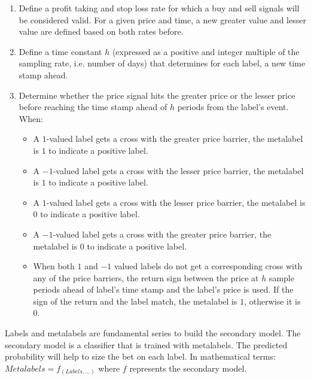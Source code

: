 \begin{enumerate}
  \item Define a profit taking and stop loss rate for which a buy and sell
        signals will be considered valid. For a given price and time, a new
        greater value and lesser value are defined based on both rates before.
  \item Define a time constant $h$ (expressed as a positive and integer multiple
        of the sampling rate, i.e. number of days) that determines for each
        label, a new time stamp ahead.
  \item Determine whether the price signal hits the greater price or the lesser
        price before reaching the time stamp ahead of $h$ periods from the
        label's event. When:
  \begin{itemize}
    \item A $1$-valued label gets a cross with the greater price barrier, the
          metalabel is $1$ to indicate a positive label.
    \item A $-1$-valued label gets a cross with the lesser price barrier, the
          metalabel is $1$ to indicate a positive label.
    \item A $1$-valued label gets a cross with the lesser price barrier, the
          metalabel is $0$ to indicate a positive label.
    \item A $-1$-valued label gets a cross with the greater price barrier, the
          metalabel is $0$ to indicate a positive label.
    \item When both $1$ and $-1$ valued labels do not get a corresponding cross 
          with any of the price barriers, the return sign between the price at
          $h$ sample periods ahead of label's time stamp and the label's price
          is used. If the sign of the return and the label match, the metalabel
          is $1$, otherwise it is $0$.
  \end{itemize}
\end{enumerate}

Labels and metalabels are fundamental series to build the secondary model. The
secondary model is a classifier that is trained with metalabels. The predicted
probability will help to size the bet on each label. In mathematical terms:
$Metalabels = f_{(Labels, ...)}$ where $f$ represents the secondary model.